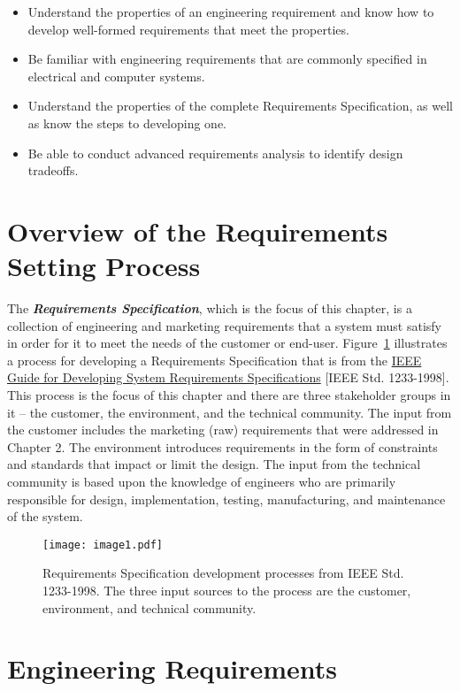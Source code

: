 \begin{itemize}
\item
  Understand the properties of an engineering requirement and know how
  to develop well-formed requirements that meet the properties.
\item
  Be familiar with engineering requirements that are commonly specified
  in electrical and computer systems.
\item
  Understand the properties of the complete Requirements Specification,
  as well as know the steps to developing one.
\item
  Be able to conduct advanced requirements analysis to identify design
  tradeoffs.
\end{itemize}

\section{Overview of the Requirements Setting Process}
\label{section':overview-of-the-requirements-setting-process}

The \emph{\textbf{Requirements Specification}}, which is the focus of
this chapter, is a collection of engineering and marketing requirements
that a system must satisfy in order for it to meet the needs of the
customer or end-user. Figure~\ref{figure: ieeeRequirements} 
illustrates a process for developing a
Requirements Specification that is from the \ul{IEEE Guide for
Developing System Requirements Specifications} {[}IEEE Std.
1233-1998{]}. This process is the focus of this chapter and there are
three stakeholder groups in it -- the customer, the environment, and the
technical community. The input from the customer includes the marketing
(raw) requirements that were addressed in Chapter 2. The environment
introduces requirements in the form of constraints and standards that
impact or limit the design. The input from the technical community is
based upon the knowledge of engineers who are primarily responsible for
design, implementation, testing, manufacturing, and maintenance of the
system.

\begin{figure}[h]
\texttt{[image: image1.pdf]}
\caption{Requirements Specification development processes
from IEEE Std. 1233-1998. The three input sources to the process are the
customer, environment, and technical community.}
\label{figure: ieeeRequirements}
\end{figure}

\section{Engineering Requirements}
\label{section:engineering-requirements}

